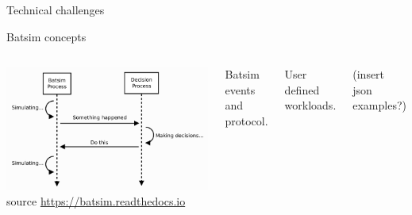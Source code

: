 \documentclass[12pt, aspectratio=43]{beamer}
\begin{document}
\begin{frame}{Technical challenges}
	\begin{enumerate}
	\end{enumerate}
\end{frame}

\begin{frame}{Batsim concepts}
	\begin{columns}
		\centering
		\includegraphics[width=\textwidth]{../imgs/batsim-sequence-diag.png}
		\tiny{source \url{https://batsim.readthedocs.io}}

		Batsim events and protocol.

		User defined workloads.

		(insert json examples?)
\end{columns}
\end{frame}
\end{document}
